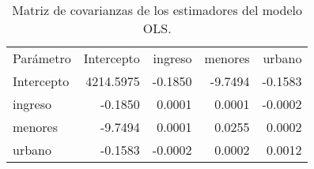 \begin{table}[H]
    \centering
    \color{blue}
    \caption{Matriz de covarianzas de los estimadores del modelo OLS.}
    \label{tab:covarianzas_parametros}
    \begin{tabular}{lrrrr}
        
        Parámetro & Intercepto & ingreso & menores & urbano \\
        
        Intercepto & 4214.5975 & -0.1850 & -9.7494 & -0.1583 \\
        ingreso   & -0.1850   & 0.0001  & 0.0001  & -0.0002 \\
        menores   & -9.7494   & 0.0001  & 0.0255  & 0.0002  \\
        urbano    & -0.1583   & -0.0002 & 0.0002  & 0.0012  \\
        
    \end{tabular}
\end{table}
